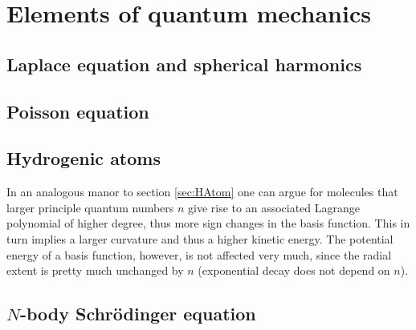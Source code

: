 \chapter{Elements of quantum mechanics}

\section{Laplace equation and spherical harmonics}

\section{Poisson equation}

\section{Hydrogenic atoms}
\label{sec:HAtom}


In an analogous manor to section \vref{sec:HAtom}
one can argue for molecules that larger principle quantum numbers
$n$ give rise to an associated Lagrange polynomial of higher degree,
thus more sign changes in the basis function.
This in turn implies a larger curvature and thus a higher kinetic energy.
The potential energy of a basis function, however,
is not affected very much,
since the radial extent is pretty much unchanged by $n$
(exponential decay does not depend on $n$).


\section{$N$-body Schrödinger equation}

